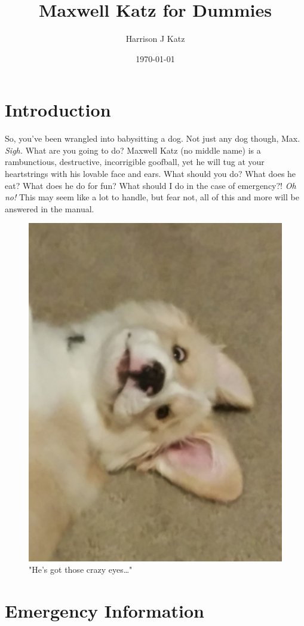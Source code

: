 \documentclass[pdftex,12pt]{article}
\title{Maxwell Katz for Dummies}
\author{Harrison J Katz}
\date{\today}
\begin{document}



\newpage
\tableofcontents

\newpage
\listoffigures

\newpage
{}

\section{Introduction}

So, you've been wrangled into babysitting a dog. Not just any dog though, Max.
\emph{Sigh.} What are you going to do? Maxwell Katz (no middle name) is a
rambunctious, destructive, incorrigible goofball, yet he will tug at your
heartstrings with his lovable face and ears. What should you do? What does he
eat? What does he do for fun? What should I do in the case of
emergency?! \emph{Oh no!} This may seem like a lot to handle, but fear not, 
all of this and more will be answered in the manual.

\bigskip

\begin{figure}[h!]
    \centering
    \includegraphics[width=.35\textwidth]{./images/max/crazy_eyes.jpg}
    \caption{"He's got those crazy eyes\ldots"}
    \label{fig:crazy_eyes}
\end{figure}

\newpage
\section{Emergency Information}
\end{document}
